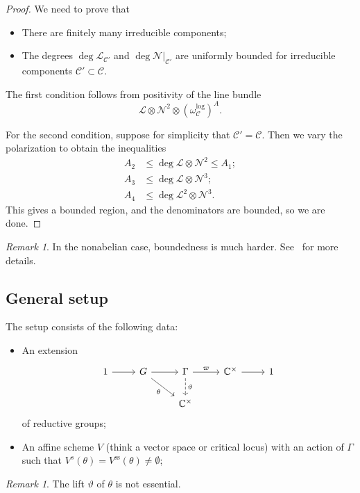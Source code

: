 \documentclass[10pt]{amsart}
\theoremstyle{definition}
\theoremstyle{remark}
\newtheorem{rmk}[thm]{Remark}
\theoremstyle{plain}
\theoremstyle{definition}
\theoremstyle{remark}
\newcommand{\C}{\mathbb{C}}
\newcommand{\mc}[1]{\mathcal{#1}}
\newcommand{\mr}[1]{\mathrm{#1}}
\newcommand{\1}{\mathbf{1}}
\newcommand{\2}{\mathbf{2}}
\newcommand{\3}{\mathbf{3}}
\begin{document}
\begin{proof}
    We need to prove that
    \begin{itemize}
        \item There are finitely many irreducible components;
        \item The degrees $\deg \mc{L}_{\mc{C}'}$ and $\deg \mc{N}|_{\mc{C}'}$ are uniformly bounded for irreducible components $\mc{C}' \subset \mc{C}$.
    \end{itemize}
    The first condition follows from positivity of the line bundle
    \[ \mc{L} \otimes \mc{N}^2 \otimes (\omega_{\mc{C}}^{\log})^A. \]
    
    For the second condition, suppose for simplicity that $\mc{C}' = \mc{C}$. Then we vary the polarization to obtain the inequalities
    \begin{align*}
        A_2 &\leq \deg \mc{L} \otimes \mc{N}^2 \leq A_1; \\
        A_3 &\leq \deg \mc{L} \otimes \mc{N}^3; \\
        A_4 &\leq \deg \mc{L}^2 \otimes \mc{N}^3 .
    \end{align*}
    This gives a bounded region, and the denominators are bounded, so we are done.
\end{proof}

\begin{rmk}
    In the nonabelian case, boundedness is much harder. See~\cite{bounded} for more details.  
\end{rmk}

\subsection{General setup}%
\label{sub:General setup}

The setup consists of the following data:
\begin{itemize}
    \item An extension
        \begin{equation*}
        \begin{tikzcd}
            1 \ar{r} & G \ar{r} \ar[swap]{dr}{\theta} & \Gamma \ar{r}{\varpi} \ar[dashrightarrow]{d}{\vartheta} & \C^{\times} \ar{r} & 1 \\
            & & \C^{\times}
        \end{tikzcd}
        \end{equation*}
        of reductive groups;
    \item An affine scheme $V$ (think a vector space or critical locus) with an action of $\Gamma$ such that $V^s(\theta) = V^{\mr{ss}}(\theta) \neq \emptyset$;
\end{itemize}
\begin{rmk}
    The lift $\vartheta$ of $\theta$ is not essential.
\end{rmk}
\end{document}
